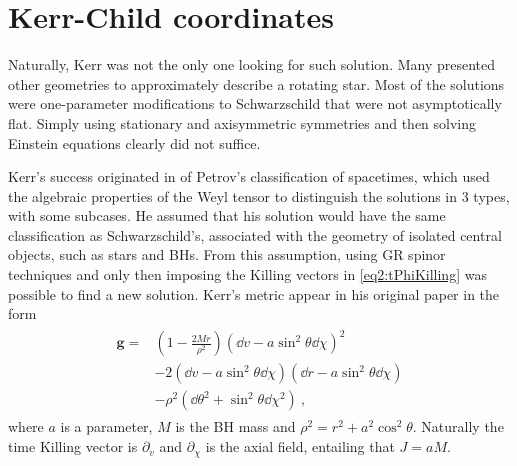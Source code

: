 \section{Kerr-Child coordinates}

Naturally, Kerr was not the only one looking for such solution.
Many presented other geometries to approximately describe a rotating star. 
Most of the solutions were one-parameter modifications to Schwarzschild that were not asymptotically flat. 
Simply using stationary and axisymmetric symmetries and then solving Einstein equations clearly did not suffice.

Kerr's success originated in of Petrov's classification of spacetimes, which used the algebraic properties of the Weyl tensor to distinguish the solutions in 3 types, with some subcases.
He assumed that his solution would have the same classification as Schwarzschild's, associated with the geometry of isolated central objects, such as stars and BHs. 
From this assumption, using GR spinor techniques and only then imposing the Killing vectors in \eqref{eq2:tPhiKilling} was possible to find a new solution. 
Kerr's metric appear in his original paper \cite{Kerr1963} in the form
\begin{align}
    \begin{split}
        \bm{g} = & \left(1 - \frac{2 M r}{\rho^2} \right) (\dd v - a \sin^2\theta \dd \chi )^2 \\
        & - 2  (\dd v - a \sin^2\theta \dd \chi )  (\dd r - a \sin^2\theta \dd \chi ) \\
        & - \rho^2 (\dd \theta^2 + \sin^2\theta \dd \chi^2 ) ~,
    \end{split}
    \label{eq2:KerrIngoingEF}
\end{align}
where $a$ is a parameter, $M$ is the BH mass and $\rho^2 = r^2 + a^2 \cos^2\theta$. Naturally the time Killing vector is $\partial_v$ and $\partial_\chi$ is the axial field, entailing that $J = a M$.

